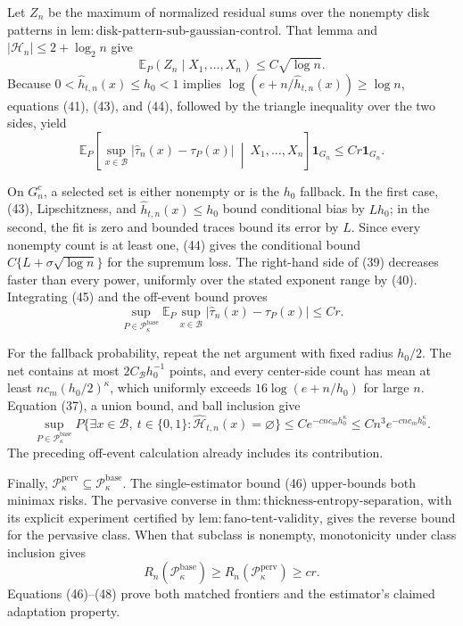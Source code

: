 Let \(Z_n\) be the maximum of normalized residual sums over the nonempty
disk patterns in
\(\mathrm{lem:disk\text{-}pattern\text{-}sub\text{-}gaussian\text{-}control}\).
That lemma and \(|\mathcal H_n|\le2+\log_2n\) give
\[
 \mathbb E_P(Z_n\mid X_1,\ldots,X_n)\le C\sqrt{\log n}.
 \tag{44}
\]
Because \(0<\widehat h_{t,n}(x)\le h_0<1\) implies
\(\log(e+n/\widehat h_{t,n}(x))\ge\log n\), equations (41), (43), and
(44), followed by the triangle inequality over the two sides, yield
\[
 \mathbb E_P\!\left[
 \sup_{x\in\mathcal B}|\widehat\tau_n(x)-\tau_P(x)|
 \ \middle|\ X_1,\ldots,X_n\right]\mathbf1_{G_n}
 \le Cr\mathbf1_{G_n}.
 \tag{45}
\]

On \(G_n^c\), a selected set is either nonempty or is the \(h_0\)
fallback.  In the first case, (43), Lipschitzness, and
\(\widehat h_{t,n}(x)\le h_0\) bound conditional bias by \(Lh_0\); in
the second, the fit is zero and bounded traces bound its error by \(L\).
Since every nonempty count is at least one, (44) gives the conditional
bound \(C\{L+\sigma\sqrt{\log n}\}\) for the supremum loss.  The
right-hand side of (39) decreases faster than every power, uniformly over
the stated exponent range by (40).  Integrating (45) and the off-event
bound proves
\[
 \sup_{P\in\mathcal P_{\kappa}^{\mathrm{base}}}
 \mathbb E_P\sup_{x\in\mathcal B}|\widehat\tau_n(x)-\tau_P(x)|
 \le Cr.
 \tag{46}
\]

For the fallback probability, repeat the net argument with fixed radius
\(h_0/2\).  The net contains at most
\(2C_{\mathcal B}h_0^{-1}\) points, and every center-side count has mean
at least \(nc_m(h_0/2)^\kappa\), which uniformly exceeds
\(16\log(e+n/h_0)\) for large \(n\).  Equation (37), a union bound, and
ball inclusion give
\[
 \sup_{P\in\mathcal P_{\kappa}^{\mathrm{base}}}
 P\{\exists x\in\mathcal B,\ t\in\{0,1\}:
 \widehat{\mathcal H}_{t,n}(x)=\varnothing\}
 \le C e^{-c n c_mh_0^\kappa}
 \le Cn^3e^{-c n c_mh_0^\kappa}.
 \tag{47}
\]
The preceding off-event calculation already includes its contribution.

Finally,
\(\mathcal P_{\kappa}^{\mathrm{perv}}\subseteq
\mathcal P_{\kappa}^{\mathrm{base}}\).  The single-estimator bound (46)
upper-bounds both minimax risks.  The pervasive converse in
\(\mathrm{thm:thickness\text{-}entropy\text{-}separation}\), with its
explicit experiment certified by
\(\mathrm{lem:fano\text{-}tent\text{-}validity}\), gives the reverse
bound for the pervasive class.  When that subclass is nonempty,
monotonicity under class inclusion gives
\[
 R_n(\mathcal P_{\kappa}^{\mathrm{base}})
 \ge R_n(\mathcal P_{\kappa}^{\mathrm{perv}})
 \ge cr.
 \tag{48}
\]
Equations (46)--(48) prove both matched frontiers and the estimator's
claimed adaptation property.